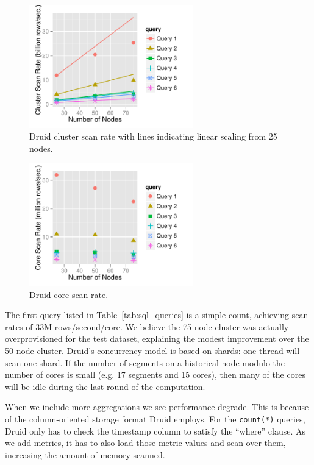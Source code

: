 \documentclass{acm_proc_article-sp}
\begin{document}
\begin{figure}
\centering
\includegraphics[width = 2.8in]{cluster_scan_rate}
\caption{Druid cluster scan rate with lines indicating linear scaling
  from 25 nodes.}
\label{fig:cluster_scan_rate}
\end{figure}

\begin{figure}
\centering
\includegraphics[width = 2.8in]{core_scan_rate}
\caption{Druid core scan rate.}
\label{fig:core_scan_rate}
\end{figure}

The first query listed in Table~\ref{tab:sql_queries} is a simple
count, achieving scan rates of 33M rows/second/core. We believe
the 75 node cluster was actually overprovisioned for the test
dataset, explaining the modest improvement over the 50 node cluster.
Druid's concurrency model is based on shards: one thread will scan one
shard. If the number of segments on a historical node modulo the number
of cores is small (e.g. 17 segments and 15 cores), then many of the
cores will be idle during the last round of the computation.

When we include more aggregations we see performance degrade.  This is
because of the column-oriented storage format Druid employs.  For the
\texttt{count(*)} queries, Druid only has to check the timestamp column to satisfy
the ``where'' clause.  As we add metrics, it has to also load those metric
values and scan over them, increasing the amount of memory scanned.
\end{document}
